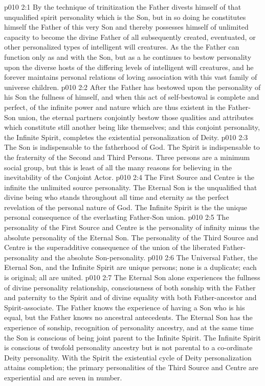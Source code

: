 \vs p010 2:1 By the technique of trinitization the Father divests himself of that unqualified spirit personality which is the Son, but in so doing he constitutes himself the Father of this very Son and thereby possesses himself of unlimited capacity to become the divine Father of all subsequently created, eventuated, or other personalized types of intelligent will creatures. As the  the Father can function only as and with the Son, but as a  he continues to bestow personality upon the diverse hosts of the differing levels of intelligent will creatures, and he forever maintains personal relations of loving association with this vast family of universe children.
\vs p010 2:2 After the Father has bestowed upon the personality of his Son the fullness of himself, and when this act of self\hyp{}bestowal is complete and perfect, of the infinite power and nature which are thus existent in the Father\hyp{}Son union, the eternal partners conjointly bestow those qualities and attributes which constitute still another being like themselves; and this conjoint personality, the Infinite Spirit, completes the existential personalization of Deity.
\vs p010 2:3 The Son is indispensable to the fatherhood of God. The Spirit is indispensable to the fraternity of the Second and Third Persons. Three persons are a minimum social group, but this is least of all the many reasons for believing in the inevitability of the Conjoint Actor.
\vs p010 2:4 \pc The First Source and Centre is the infinite  the unlimited source personality. The Eternal Son is the unqualified  that divine being who stands throughout all time and eternity as the perfect revelation of the personal nature of God. The Infinite Spirit is the  the unique personal consequence of the everlasting Father\hyp{}Son union.
\vs p010 2:5 \pc The personality of the First Source and Centre is the personality of infinity minus the absolute personality of the Eternal Son. The personality of the Third Source and Centre is the superadditive consequence of the union of the liberated Father\hyp{}personality and the absolute Son\hyp{}personality.
\vs p010 2:6 \pc The Universal Father, the Eternal Son, and the Infinite Spirit are unique persons; none is a duplicate; each is original; all are united.
\vs p010 2:7 \pc The Eternal Son alone experiences the fullness of divine personality relationship, consciousness of both sonship with the Father and paternity to the Spirit and of divine equality with both Father\hyp{}ancestor and Spirit\hyp{}associate. The Father knows the experience of having a Son who is his equal, but the Father knows no ancestral antecedents. The Eternal Son has the experience of sonship, recognition of personality ancestry, and at the same time the Son is conscious of being joint parent to the Infinite Spirit. The Infinite Spirit is conscious of twofold personality ancestry but is not parental to a co\hyp{}ordinate Deity personality. With the Spirit the existential cycle of Deity personalization attains completion; the primary personalities of the Third Source and Centre are experiential and are seven in number.

